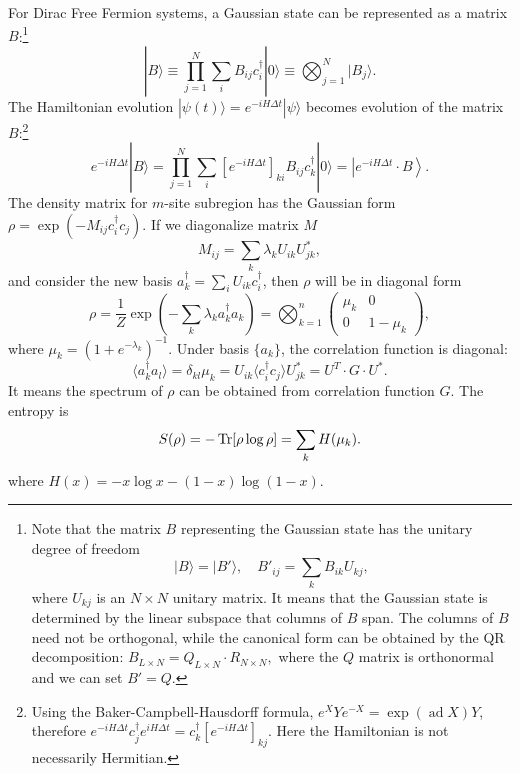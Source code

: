 \documentclass{SciPost}
\begin{document}
For Dirac Free Fermion systems, a Gaussian state can be represented as a matrix $B$:\footnote{Note that the matrix $B$ representing the Gaussian state has the unitary degree of freedom $$|B\rangle = |B'\rangle, \quad B'_{ij} = \sum_k B_{ik}U_{kj},$$ where $U_{kj}$ is an $N\times N$ unitary matrix. It means that the Gaussian state is determined by the linear subspace that columns of $B$ span. The columns of $B$ need not be orthogonal, while the canonical form can be obtained by the QR decomposition: $B_{L\times N} = Q_{L\times N} \cdot R_{N\times N},$ where the $Q$ matrix is orthonormal and we can set $B' = Q$.} 
\begin{equation}
	|B\rangle \equiv \prod_{j=1}^N \sum_i B_{ij} c_{i}^\dagger |0\rangle 
	\equiv \bigotimes_{j=1}^N |B_j\rangle.
\end{equation}
The Hamiltonian evolution $|\psi(t)\rangle = e^{-iH \Delta t} |\psi\rangle$ becomes evolution of the matrix $B$:\footnote{Using the Baker-Campbell-Hausdorff formula, $e^X Y e^{-X} = \exp(\operatorname{ad} X) Y$, therefore $e^{-iH \Delta t} c_j^\dagger e^{iH \Delta t} = c_k^\dagger[e^{-iH \Delta t}]_{kj}$. Here the Hamiltonian is not necessarily Hermitian.}
\begin{equation}
	e^{-iH \Delta t}|B\rangle = \prod_{j=1}^N \sum_i \left[e^{-iH \Delta t}\right]_{ki} B_{ij} c_{k}^\dagger |0\rangle = \left|e^{-iH \Delta t}\cdot B \right\rangle.
\end{equation}
The density matrix for $m$-site subregion has the Gaussian form $\rho = \exp(-M_{ij}c_i^\dagger c_j)$. If we diagonalize matrix $M$
\begin{equation}
	M_{ij} = \sum_k \lambda_k U_{ik}  U^*_{jk},
\end{equation}
and consider the new basis $a_k^\dagger = \sum_i U_{ik}c_i^\dagger$, then $\rho$ will be in diagonal form
\begin{equation}
	\rho = \frac{1}{Z}\exp\left(-\sum_k \lambda_k a_k^\dagger a_k\right) 
	= \bigotimes_{k=1}^n \begin{pmatrix} 
		\mu_k & 0 \\ 0 & 1-\mu_k 
	\end{pmatrix},
\end{equation}
where $\mu_k = (1+e^{-\lambda_k})^{-1}$. 
Under basis $\{a_k\}$, the correlation function is diagonal: 
\begin{equation}
	\langle a_k^\dagger a_l\rangle = \delta_{kl}\mu_k = U_{ik}\langle c_i^\dagger c_j\rangle U_{jk}^* = U^T\cdot G\cdot U^*.
\end{equation}
It means the spectrum of $\rho$ can be obtained from correlation function $G$.
The entropy is
\begin{equation}
	S(\rho) = -\operatorname{Tr}[\rho \log \rho] = \sum_k H(\mu_k).
\end{equation}
where $H(x) = -x\log x - (1-x)\log(1-x)$.
\end{document}
